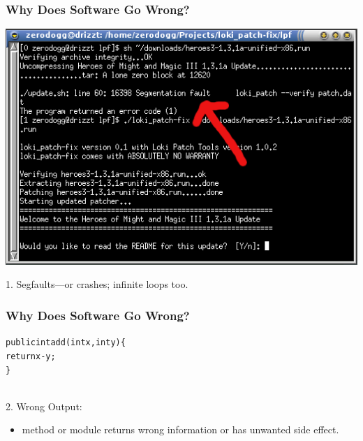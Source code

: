 \documentclass{beamer}
\newenvironment{changemargin}[1]{%
  \begin{list}{}{%
    \setlength{\topsep}{0pt}%
    \setlength{\leftmargin}{#1}%
    \setlength{\rightmargin}{1em}
    \setlength{\listparindent}{\parindent}%
    \setlength{\itemindent}{\parindent}%
    \setlength{\parsep}{\parskip}%
  }%
  \item[]}{\end{list}}
\begin{document}
\begin{frame}

  \frametitle{Why Does Software Go Wrong?}

\begin{center}
  \includegraphics[height=0.6\textheight]{L01/lpf.png}
\end{center}

\begin{changemargin}{2em}
  1. Segfaults---or crashes; infinite loops too.
\end{changemargin}

\end{frame}

\begin{frame}

  \frametitle{Why Does Software Go Wrong?}

\begin{changemargin}{2em}
\begin{alltt}
    public int add(int x, int y) \{ \\
\qquad      return x - y; \\
\}

\end{alltt}
~\\[1em]
\Large
  2. Wrong Output:
\begin{itemize}
  \item method or module returns wrong information or has unwanted side effect.
\end{itemize}
\end{changemargin}

\end{frame}
\end{document}
